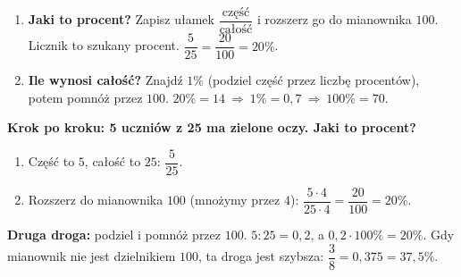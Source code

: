 \documentclass[11pt,a4paper]{article}
\begin{document}

\vspace{0.3em}
\begin{regula}
\begin{enumerate}[leftmargin=*, itemsep=3pt]
  \item \textbf{Jaki to procent?} Zapisz ułamek $\dfrac{\text{część}}{\text{całość}}$ i rozszerz go do mianownika $100$. Licznik to szukany procent. \quad $\dfrac{5}{25}=\dfrac{20}{100}=20\%$.
  \item \textbf{Ile wynosi całość?} Znajdź $1\%$ (podziel część przez liczbę procentów), potem pomnóż przez $100$. \quad $20\%=14\ \Rightarrow\ 1\%=0{,}7\ \Rightarrow\ 100\%=70$.
\end{enumerate}
\end{regula}

\vspace{0.4em}
\textbf{Krok po kroku: 5 uczniów z 25 ma zielone oczy. Jaki to procent?}
\begin{enumerate}[leftmargin=*, itemsep=3pt]
  \item Część to $5$, całość to $25$: $\dfrac{5}{25}$.
  \item Rozszerz do mianownika $100$ (mnożymy przez $4$): $\dfrac{5\cdot 4}{25\cdot 4}=\dfrac{20}{100}=20\%$.
\end{enumerate}
\textbf{Druga droga:} podziel i pomnóż przez $100$. $5:25=0{,}2$, a $0{,}2\cdot 100\%=20\%$. Gdy mianownik nie jest dzielnikiem $100$, ta droga jest szybsza: $\dfrac{3}{8}=0{,}375=37{,}5\%$.

\begin{center}
\end{center}
\end{document}
